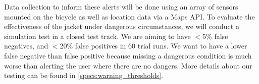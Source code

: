 
Data collection to inform these alerts will be done using an array of sensors mounted on the bicycle as well as location data via a Maps API. To evaluate the effectiveness of the jacket under dangerous circumstances, we will conduct a simulation test in a closed test track. We are aiming to have $<$5\% false negatives, and $<$20\% false positives in 60 trial runs. We want to have a lower false negative than false positive because missing a dangerous condition is much worse than alerting the user where there are no dangers. More details about our testing can be found in \ref{specs:warning_thresholds}.